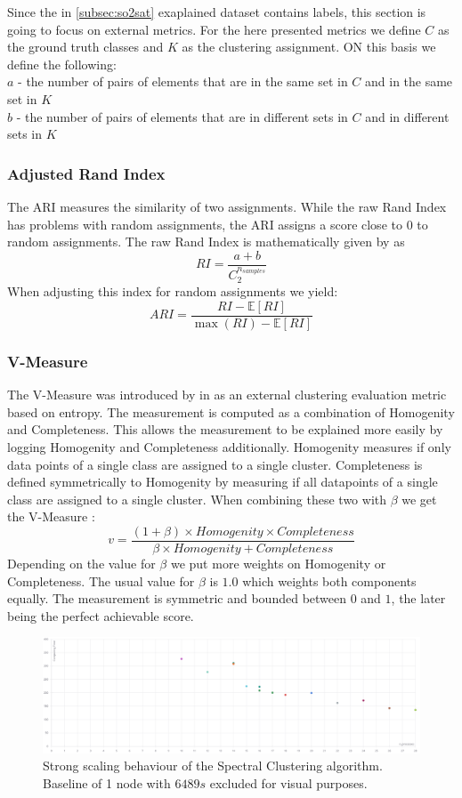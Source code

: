 Since the in \cref{subsec:so2sat} exaplained dataset contains labels, this section is going to focus on external metrics.
For the here presented metrics we define \(C\) as the ground truth classes and \(K\) as the clustering assignment.
ON this basis we define the following:\\
\(a\) - the number of pairs of elements that are in the same set in \(C\) and in the same set in \(K\)\\
\(b\) - the number of pairs of elements that are in different sets in \(C\) and in different sets in \(K\)\\


\subsubsection{Adjusted Rand Index}
The \gls{ARI} measures the similarity of two assignments. While the raw Rand Index has problems with random assignments, the \gls{ARI} assigns a score close to \(0\)
to random assignments.
The raw Rand Index is mathematically given by \cite{noauthor_23_2020} as
\[RI = \frac{a + b}{C_2^{n_{samples}}}\]
When adjusting this index for random assignments we yield:
\[ARI = \frac{RI - \mathbb{E} [RI]}{\max (RI) - \mathbb{E} [RI]}\]


\subsubsection{V-Measure}
\label{ssec:v_measure}
The V-Measure was introduced by \citeauthor{rosenberg_v-measure_2007} in \cite{rosenberg_v-measure_2007} as an external clustering evaluation metric based on entropy.
The measurement is computed as a combination of Homogenity and Completeness. This allows the measurement to be explained more easily by logging Homogenity and Completeness additionally.
Homogenity measures if only data points of a single class are assigned to a single cluster. Completeness is defined symmetrically to Homogenity by measuring if all datapoints of a single class are assigned to
a single cluster.
When combining these two with \(\beta\) we get the V-Measure \cite{noauthor_23_2020}:
\[v = \frac{(1 + \beta) \times \mathit{Homogenity} \times \mathit{Completeness}}{\beta \times \mathit{Homogenity} + \mathit{Completeness}}\]
Depending on the value for \(\beta\) we put more weights on Homogenity or Completeness. The usual value for \(\beta\) is \(1.0\) which weights both components equally.
The measurement is symmetric and bounded between \(0\) and \(1\), the later being the perfect achievable score.



\begin{figure}
  \includegraphics[width=0.9\linewidth]{images/strong_scaling_chart.png}
  \caption{Strong scaling behaviour of the Spectral Clustering algorithm. Baseline of 1 node with \(6489s\) excluded for visual purposes.}\label{fig:strong_scaling}
\end{figure}
